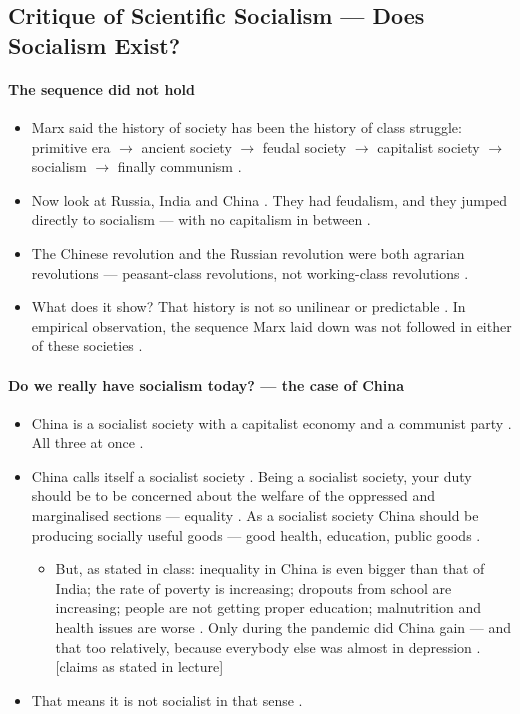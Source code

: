 \subsection{Critique of Scientific Socialism --- Does Socialism Exist?}

\paragraph{The sequence did not hold}
\begin{itemize}
    \item Marx said the history of society has been the history of class struggle: primitive era $\rightarrow$ ancient society $\rightarrow$ feudal society $\rightarrow$ capitalist society $\rightarrow$ socialism $\rightarrow$ finally communism .
    \item Now look at Russia, India and China . They had feudalism, and they jumped directly to socialism --- with no capitalism in between .
    \item The Chinese revolution and the Russian revolution were both agrarian revolutions --- peasant-class revolutions, not working-class revolutions .
    \item What does it show? That history is not so unilinear or predictable . In empirical observation, the sequence Marx laid down was not followed in either of these societies .
\end{itemize}

\paragraph{Do we really have socialism today? --- the case of China}
\begin{itemize}
    \item China is a socialist society with a capitalist economy and a communist party . All three at once .
    \item China calls itself a socialist society . Being a socialist society, your duty should be to be concerned about the welfare of the oppressed and marginalised sections --- equality . As a socialist society China should be producing socially useful goods --- good health, education, public goods .
    \begin{itemize}
        \item But, as stated in class: inequality in China is even bigger than that of India; the rate of poverty is increasing; dropouts from school are increasing; people are not getting proper education; malnutrition and health issues are worse . Only during the pandemic did China gain --- and that too relatively, because everybody else was almost in depression . [claims as stated in lecture] 
    \end{itemize}
    \item That means it is not socialist in that sense .
\end{itemize}

